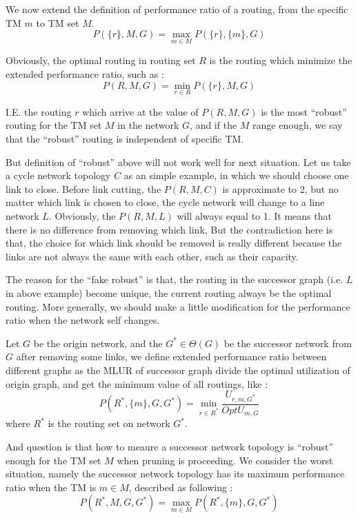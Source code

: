 \documentclass[conference]{IEEEtran}
\begin{document}
We now extend the definition of performance ratio of a routing, from the specific TM $m$ to TM set $M$. 
\begin{equation}
	P(\{ r \}, M, G) = \max_{m\in M} P(\{ r \}, \{ m \}, G)
\end{equation}

Obviously, the optimal routing in routing set $R$ is the routing which minimize the extended performance ratio, such as :
\begin{equation}
	P(R, M, G) = \min_{r\in R} P(\{ r \}, M, G)
\end{equation}

I.E. the routing $r$ which arrive at the value of $P(R,M,G)$ is the most ``robust'' routing for the TM set $M$ 
in the network $G$, and if the $M$ range enough, we say that the ``robust'' routing is independent of specific TM.

But definition of ``robust'' above will not work well for next situation. Let us take a cycle network topology $C$ as 
an simple example, in which we should choose one link to close. Before link cutting, the $P(R, M, C)$ is 
approximate to 2, but no matter which link is chosen to close, the cycle network will change to a line network $L$. 
Obviously, the $P(R, M, L)$ will always equal to 1. It means that there is no difference from removing which link,
But the contradiction here is that, the choice for which link should be removed is really different because the 
links are not always the same with each other, such as their capacity.

The reason for the ``fake robust'' is that, the routing in the successor graph (i.e. $L$ in above example) become 
unique, the current routing always be the optimal routing. More generally, we should make a little modification
for the performance ratio when the network self changes.

Let $G$ be the origin network, and the $G^* \in \Theta(G)$ be the successor network from $G$ after removing
some links, we define extended performance ratio between different graphs as the MLUR of successor graph divide 
the optimal utilization of origin graph, and get the minimum value of all routings, like :
\begin{equation}
	P(R^*, \{ m\}, G, G^*) = \min_{r \in R^*} \frac{U_{r,m,G^*}}{OptU_{m,G}}
\end{equation}
where $R^*$ is the routing set on network $G^*$.

And question is that how to meaure a successor network topology is ``robust'' enough for the TM set $M$ when 
pruning is proceeding. We consider the worst situation, namely the successor network topology has its maximum
performance ratio when the TM is $m \in M$, described as following :
\begin{equation}
	P(R^*, M, G, G^*) = \max_{m \in M} P(R^*, \{ m \}, G, G^*)
\end{equation}
\end{document}
